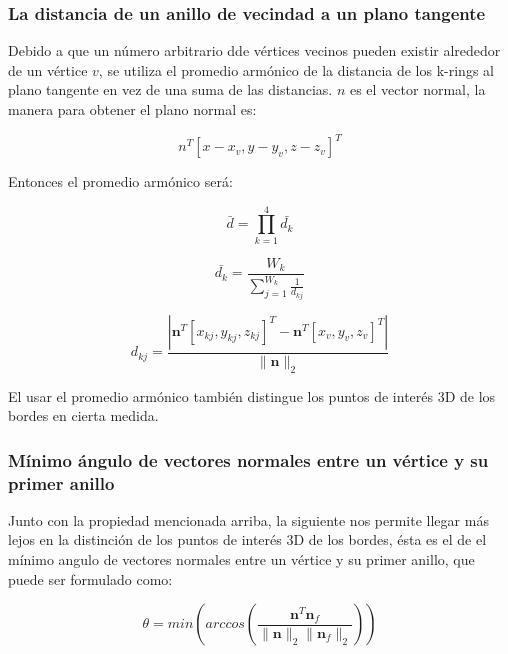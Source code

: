 \documentclass[conference]{IEEEtran}
\begin{document}
\subsubsection{La distancia de un anillo de vecindad a un plano tangente}
Debido a que un número arbitrario dde vértices vecinos pueden existir alrededor de un vértice $v$, se utiliza el promedio armónico de la distancia de los k-rings al plano tangente en vez de una suma de las distancias. $n$ es el vector normal, la manera para obtener el plano normal es:

\[n^{T}[x-x_{v}, y-y_{v}, z-z_{v}]^{T}\]

Entonces el promedio armónico será:

\begin{equation}
	\bar{d} = \prod_{k=1}^{4} \bar{d_{k}}
\end{equation}

\begin{equation}
	\bar{d_{k}} = \frac{W_{k}}{\sum_{j=1}^{W_{k}} \frac{1}{d_{kj}}}
\end{equation}

\begin{equation} \label{eq:dkj}
	d_{kj} = \frac{|\bm{n}^{T}[x_{kj}, y_{kj}, z_{kj}]^{T} - \bm{n}^{T}[x_{v}, y_{v}, z_{v}]^{T}|}{\|\bm{n}\|_{2}}
\end{equation}

El usar el promedio armónico también distingue los puntos de interés 3D de los bordes en cierta medida.

\subsubsection{Mínimo ángulo de vectores normales entre un vértice y su primer anillo}
Junto con la propiedad mencionada arriba, la siguiente nos permite llegar más lejos en la distinción de los puntos de interés 3D de los bordes, ésta es el de el mínimo angulo de vectores normales entre un vértice y su primer anillo, que puede ser formulado como:


\begin{equation} \label{eq:teta}
	\theta = min(arccos(\frac{\bm{n}^{T}\bm{n}_{f}}{\|\bm{n}\|_{2}\|\bm{n}_{f}\|_{2}}))
\end{equation}

\end{document}

